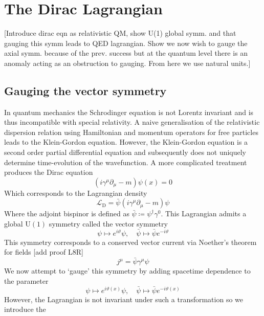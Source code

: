 \documentclass[11pt, a4paper]{article}
\theoremstyle{definition}
\theoremstyle{plain}
\begin{document}
\section{The Dirac Lagrangian}
[Introduce dirac eqn as relativistic QM,
show U(1) global symm. and that gauging this symm leads to QED lagrangian.
Show we now wish to gauge the axial symm. because of the prev. success but 
at the quantum level there is an anomaly acting as an obstruction to gauging.
From here we use natural units.]

\subsection{Gauging the vector symmetry}

In quantum mechanics the Schrodinger equation is not Lorentz invariant and is thus
incompatible with special relativity. A naive generalisation of the relativistic
dispersion relation using Hamiltonian and momentum operators
for free particles leads to the Klein-Gordon
equation. However, the Klein-Gordon equation is a second order partial differential equation and
subsequently does not uniquely determine time-evolution of the wavefunction.
A more complicated treatment produces the Dirac equation
\begin{equation}
  (i \gamma^\mu\partial_\mu - m)\psi(x) = 0
\end{equation}
Which corresponds to the Lagrangian density
\begin{equation}
  \mathcal{L}_\mathrm{D} = \bar{\psi}(i \gamma^\mu\partial_\mu - m)\psi
\end{equation}
Where the adjoint bispinor is defined as $\bar{\psi} \coloneq \psi^\dagger\gamma^0$.
This Lagrangian admits a global $\mathrm{U}(1)$ symmetry called the vector symmetry
\begin{equation}
  \psi \mapsto e^{i\vartheta}\psi, \quad \bar{\psi} \mapsto \bar{\psi}e^{-i\vartheta} 
\end{equation}
This symmetry corresponds to a conserved vector current via Noether's theorem for fields
[add proof L8R]
\begin{equation}
  j^\mu = \bar{\psi}\gamma^\mu\psi
\end{equation}
We now attempt to `gauge' this symmetry by adding spacetime dependence to the 
parameter
\begin{equation}
  \psi \mapsto e^{i\vartheta(x)}\psi, \quad \bar{\psi} \mapsto \bar{\psi}e^{-i\vartheta(x)}  
\end{equation}
However, the Lagrangian is not invariant under such a transformation so we introduce the
\end{document}
